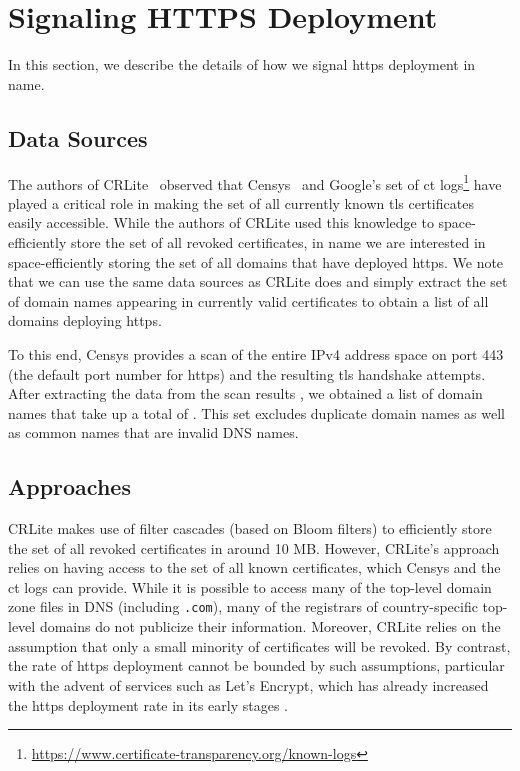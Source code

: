 \section{Signaling HTTPS Deployment}
\label{sec:signaling}

In this section, we describe the details of how we signal \ac{https} deployment
in \ac{name}.

\subsection{Data Sources}

The authors of CRLite~\cite{larisch2017crlite} observed that
Censys~\cite{durumeric2015search} and Google's set of \ac{ct}
logs\footnote{\url{https://www.certificate-transparency.org/known-logs}} have
played a critical role in making the set of all currently known \ac{tls}
certificates easily accessible. While the authors of CRLite used this knowledge
to space-efficiently store the set of all revoked certificates, in \ac{name} we
are interested in space-efficiently storing the set of all domains that have
deployed \ac{https}. We note that we can use the same data sources as CRLite
does and simply extract the set of domain names appearing in currently valid
certificates to obtain a list of all domains deploying \ac{https}.

To this end, Censys provides a scan of the entire IPv4 address space on port 443
(the default port number for \ac{https}) and the resulting \ac{tls} handshake
attempts.   After
extracting the data from the  scan results
, we obtained a list of
 domain names that take up a total of
. This set excludes duplicate domain names as well as
common names  that are invalid DNS names.

\subsection{Approaches}


CRLite makes use of filter cascades (based on Bloom filters) to efficiently
store the set of all revoked certificates in around 10 MB. However, CRLite's
approach relies on having access to the set of all known certificates, which
Censys and the \ac{ct} logs can provide. While it is possible to access many of
the top-level domain zone files in DNS (including \texttt{.com}), many of the
registrars of country-specific top-level domains do not publicize their
information. Moreover, CRLite relies on the  assumption that
only a small minority of certificates will be revoked. By contrast, the rate of
\ac{https} deployment cannot be bounded by such assumptions, particular with the
advent of services such as Let's Encrypt, which has already increased the
\ac{https} deployment rate in its early stages .

